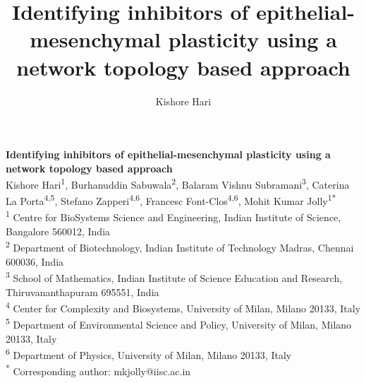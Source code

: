 \documentclass[preprint,review,12pt]{elsarticle}
\begin{document}
	\title{Identifying inhibitors of epithelial-mesenchymal plasticity using a network topology based approach}
	\author{Kishore Hari}
	
	\begin{center}
		\Large{\textbf{Identifying inhibitors of epithelial-mesenchymal 
				plasticity using a network topology based approach}}
		\newline
		\\
		\small{
			Kishore Hari\textsuperscript{1},
			Burhanuddin Sabuwala\textsuperscript{2},
			Balaram Vishnu Subramani\textsuperscript{3},
			Caterina La Porta\textsuperscript{4,5},
			Stefano Zapperi\textsuperscript{4,6},
			Francesc Font-Clos\textsuperscript{4,6},
			Mohit Kumar Jolly\textsuperscript{1*}
			\\
			\bigskip
			\textsuperscript{1} Centre for BioSystems Science and Engineering, Indian Institute of Science, 
			Bangalore 560012, India
			\\
			\textsuperscript{2} Department of Biotechnology, Indian Institute of Technology Madras, Chennai 600036, India
			\\
			\textsuperscript{3} School of Mathematics, Indian Institute of Science Education and Research, Thiruvananthapuram 695551, India
			\\
			\textsuperscript{4} Center for Complexity and Biosystems, University of Milan, Milano 20133, Italy 
			\\
			\textsuperscript{5} Department of Environmental Science and Policy, University of Milan, Milano 20133, Italy
			\\
			\textsuperscript{6} Department of Physics, University of Milan, Milano 20133, Italy
			\\
			\textsuperscript{*} Corresponding author: mkjolly@iisc.ac.in
		}
	\end{center}
\end{document}
